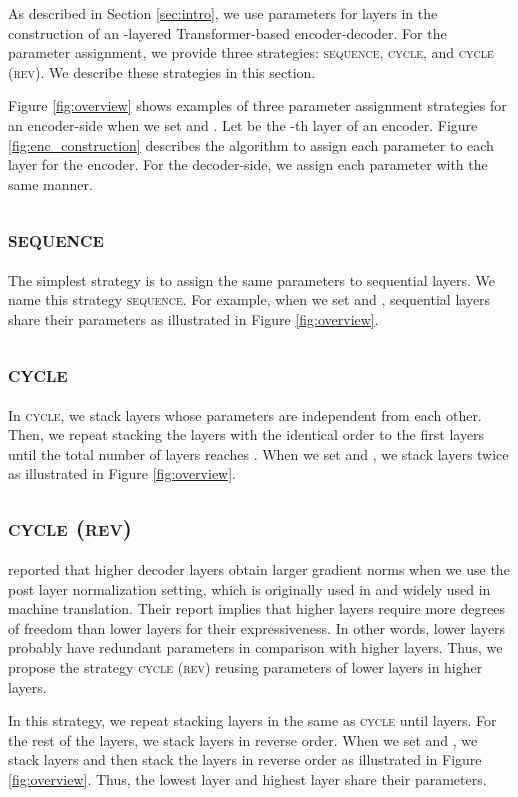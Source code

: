 \documentclass[11pt]{article}
\begin{document}
As described in Section \ref{sec:intro}, we use parameters for  layers in the construction of an -layered Transformer-based encoder-decoder.
For the parameter assignment, we provide three strategies: \textsc{sequence}, \textsc{cycle}, and \textsc{cycle (rev)}.
We describe these strategies in this section.

Figure \ref{fig:overview} shows examples of three parameter assignment strategies for an encoder-side when we set  and .
Let  be the -th layer of an encoder.
Figure \ref{fig:enc_construction} describes the algorithm to assign each parameter to each layer for the encoder.
For the decoder-side, we assign each parameter with the same manner.


\subsection{\textsc{sequence}}
The simplest strategy is to assign the same parameters to sequential  layers.
We name this strategy \textsc{sequence}.
For example, when we set  and , sequential  layers share their parameters as illustrated in Figure \ref{fig:overview}.



\subsection{\textsc{cycle}}
In \textsc{cycle}, we stack  layers whose parameters are independent from each other.
Then, we repeat stacking the  layers with the identical order to the first  layers until the total number of layers reaches .
When we set  and , we stack  layers twice as illustrated in Figure \ref{fig:overview}.


\subsection{\textsc{cycle (rev)}}
 reported that higher decoder layers obtain larger gradient norms when we use the post layer normalization setting, which is originally used in  and widely used in machine translation.
Their report implies that higher layers require more degrees of freedom than lower layers for their expressiveness.
In other words, lower layers probably have redundant parameters in comparison with higher layers.
Thus, we propose the strategy \textsc{cycle (rev)} reusing parameters of lower layers in higher layers.


In this strategy, we repeat stacking  layers in the same as \textsc{cycle} until  layers.
For the rest of the layers, we stack  layers in reverse order.
When we set  and , we stack  layers and then stack the  layers in reverse order as illustrated in Figure \ref{fig:overview}.
Thus, the lowest layer and highest layer share their parameters.
\end{document}
